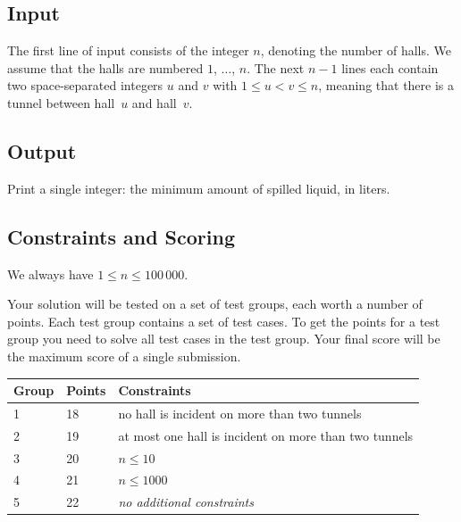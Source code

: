\subsection*{Input}

The first line of input consists of the integer $n$, denoting the number of halls.
We assume that the halls are numbered $1$, $\ldots$, $n$.
The next $n-1$ lines each contain two space-separated integers $u$ and $v$ with 
$1\leq u < v \leq n$, %
meaning that there is a tunnel between hall~$u$ and hall~$v$.

\subsection*{Output}

Print a single integer: the minimum amount of spilled liquid, in liters.

\subsection*{Constraints and Scoring}

We always have
$1\leq n\leq 100\,000$. %

Your solution will be tested on a set of test groups, each worth a number of points.
Each test group contains a set of test cases.
To get the points for a test group you need to solve all test cases in the test group.
Your final score will be the maximum score of a single submission.

\medskip
\begin{tabular}{lll}
Group & Points & Constraints \\\hline
1 & 18 & no hall is incident on more than two tunnels\\
2 & 19 & at most one hall is incident on more than two tunnels\\
3 & 20 & $n\leq 10$\\
4 & 21 & $n\leq 1000$\\
5 & 22 & \emph{no additional constraints}
\end{tabular}
